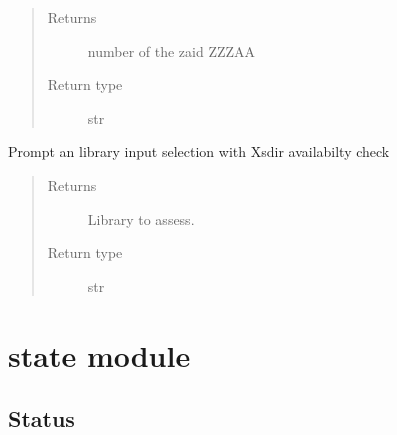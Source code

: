 \documentclass[letterpaper,10pt,english]{sphinxmanual}
\begin{document}
\begin{fulllineitems}
\begin{fulllineitems}
\begin{quote}
\begin{description}
\item[{Returns}] \leavevmode
{} \textendash{} number of the zaid ZZZAA

\item[{Return type}] \leavevmode
str

\end{description}\end{quote}

\end{fulllineitems}


\begin{fulllineitems}
\label{\detokenize{api/initobjects:libmanager.LibManager.select_lib}}
Prompt an library input selection with Xsdir availabilty check
\begin{quote}\begin{description}
\item[{Returns}] \leavevmode
{} \textendash{} Library to assess.

\item[{Return type}] \leavevmode
str

\end{description}\end{quote}

\end{fulllineitems}


\end{fulllineitems}



\section{state module}
\label{\detokenize{api/initobjects:state-module}}

\subsection{Status}
\label{\detokenize{api/initobjects:status}}\label{\detokenize{api/initobjects:statusob}}
\end{document}
